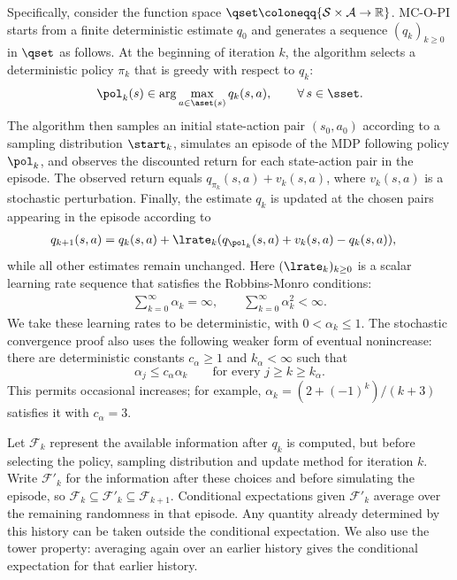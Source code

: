Specifically, consider the function space $\qset \coloneqq \{ \mathcal S \times \mathcal A \to \mathbb R \}$.
MC-O-PI starts from a finite deterministic estimate $q_0$ and generates a sequence $(q_k)_{k \ge 0}$ in $\qset$ as follows.
At the beginning of iteration $k$, the algorithm selects a deterministic policy $\pi_k$ that is greedy with respect to $q_k$:
\begin{align}
\label{eq: greedy policy definition}
    \pol_k(s) \in \arg\max_{a \in \aset(s)} q_k(s,a),
    \qquad \forall \, s \in \sset .
\end{align}
The algorithm then samples an initial state-action pair $(s_0, a_0)$ according to a sampling distribution $\start_k$,
simulates an episode of the MDP following policy $\pol_k$, and observes the discounted return for each state-action pair in the episode.
The observed return equals $q_{\pi_k}(s,a) + v_k(s,a)$, where $v_k(s,a)$ is a stochastic perturbation.
Finally, the estimate $q_k$ is updated at the chosen pairs appearing in the episode
according to
\begin{align}
\label{eq: MC eval update}
    q_{k+1}(s, a)
    &= q_k(s,a) +  \lrate_k( q_{\pol_k}(s, a) + v_k(s, a) - q_k(s,a) ) ,
\end{align}
while all other estimates remain unchanged. Here $(\lrate_k)_{k \ge 0}$ is a scalar learning rate sequence that satisfies the Robbins-Monro conditions:
\begin{align}
 \label{eq: robbins monro conditions}
    \sum_{k =0}^\infty \alpha_k = \infty ,
    \qquad
    \sum_{k =0}^\infty \alpha_k^2 < \infty .
\end{align}
We take these learning rates to be deterministic, with $0<\alpha_k\le1$. The stochastic convergence proof also uses the following weaker form of eventual nonincrease: there are deterministic constants $c_\alpha\ge1$ and $k_\alpha<\infty$ such that
\begin{equation}
\label{eq:comparison}
\alpha_j\le c_\alpha\alpha_k\qquad\text{for every }j\ge k\ge k_\alpha.
\end{equation}
This permits occasional increases; for example, $\alpha_k=(2+(-1)^k)/(k+3)$ satisfies it with $c_\alpha=3$.

Let $\mathcal F_k$ represent the available information after $q_k$ is computed, but before selecting the policy, sampling distribution and update method for iteration $k$.
Write $\mathcal F'_k$ for the information after these choices and before simulating the episode, so $\mathcal F_k\subseteq\mathcal F'_k\subseteq\mathcal F_{k+1}$.
Conditional expectations given $\mathcal F'_k$ average over the remaining randomness in that episode. Any quantity already determined by this history can be taken outside the conditional expectation. We also use the tower property: averaging again over an earlier history gives the conditional expectation for that earlier history.

